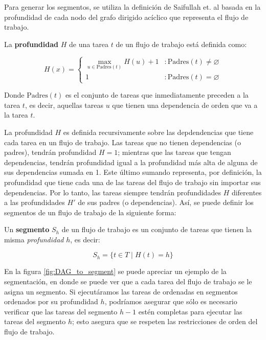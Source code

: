 Para generar los segmentos, se utiliza la definición de Saifullah et. al \cite{saifullah2013multi} basada en la profundidad de cada nodo del grafo dirigido acíclico que representa el flujo de trabajo.

\begin{defn}

La \textbf{profundidad} $H$ de una tarea $t$ de un flujo de trabajo está definida como:

\begin{displaymath}
H(x) = \left\{
     \begin{array}{lr}
       \max_{u \in \text{Padres}(t) } H(u) + 1 & : \text{Padres}(t) \neq \varnothing \\
       1                                       & : \text{Padres}(t) = \varnothing
     \end{array}
   \right.
\end{displaymath}

\noindent Donde $\text{Padres}(t)$ es el conjunto de tareas que inmediatamente preceden a la tarea $t$, es decir, aquellas tareas $u$ que tienen una dependencia de orden que va a la tarea $t$.
\end{defn}

La profundidad $H$ es definida recursivamente sobre las depdendencias que tiene cada tarea en un flujo de trabajo. Las tareas que no tienen dependencias (o padres), tendrán profundidad $H = 1$; mientras que las tareas que tengan dependencias, tendrán profundidad igual a la profundidad más alta de alguna de sus dependencias sumada en 1. Este último sumando representa, por definición, la profundidad que tiene cada una de las tareas del flujo de trabajo sin importar sus dependencias. Por lo tanto, las tareas siempre tendrán profundidades $H$ diferentes a las profundidades $H'$ de sus padres (o dependencias). Así, se puede definir los segmentos de un flujo de trabajo de la siguiente forma:

\begin{defn}
Un \textbf{segmento} $S_h$ de un flujo de trabajo es un conjunto de tareas que tienen la misma \emph{profundidad} $h$, es decir: 

\begin{displaymath}
S_h = \{ t \in T \mid H(t) = h \}
\end{displaymath}

\end{defn}

En la figura \ref{fig:DAG_to_segment} se puede apreciar un ejemplo de la segmentación, en donde se puede ver que a cada tarea del flujo de trabajo se le asigna un segmento. Si ejecutáramos las tareas de ordenadas en segmentos ordenados por su profundidad $h$, podríamos asegurar que sólo es necesario verificar que las tareas del segmento $h - 1$ estén completas para ejecutar las tareas del segmento $h$; esto asegura que se respeten las restricciones de orden del flujo de trabajo.

